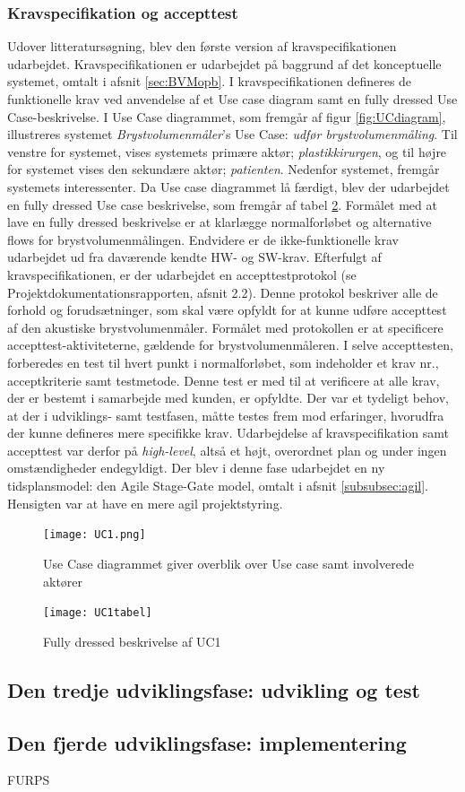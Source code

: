 	\subsubsection{Kravspecifikation og accepttest} 
	Udover litteratursøgning, blev den første version af kravspecifikationen udarbejdet. Kravspecifikationen er udarbejdet på baggrund af det konceptuelle systemet, omtalt i afsnit \ref{sec:BVMopb}. I kravspecifikationen defineres de funktionelle krav ved anvendelse af et Use case diagram samt en fully dressed Use Case-beskrivelse. I Use Case diagrammet, som fremgår af figur \ref{fig:UCdiagram}, illustreres systemet \textit{Brystvolumenmåler}'s Use Case: \textit{udfør brystvolumenmåling}. Til venstre for systemet, vises systemets primære aktør; \textit{plastikkirurgen}, og til højre for systemet vises den sekundære aktør; \textit{patienten}. Nedenfor systemet, fremgår systemets interessenter. Da Use case diagrammet lå færdigt, blev der udarbejdet en fully dressed Use case beskrivelse, som fremgår af tabel \ref{UCtabel}.
	 Formålet med at lave en fully dressed beskrivelse er at klarlægge normalforløbet og alternative flows for brystvolumenmålingen. Endvidere er de ikke-funktionelle krav udarbejdet ud fra daværende kendte HW- og SW-krav.
	Efterfulgt af kravspecifikationen, er der udarbejdet en  accepttestprotokol (se Projektdokumentationsrapporten, afsnit 2.2). Denne protokol beskriver alle de forhold og forudsætninger, som skal være opfyldt for at kunne udføre accepttest af den akustiske brystvolumenmåler. Formålet med protokollen er at specificere accepttest-aktiviteterne, gældende for brystvolumenmåleren. 
	I selve accepttesten, forberedes en test til hvert punkt i normalforløbet, som indeholder et krav nr., acceptkriterie samt testmetode. Denne test er med til at verificere at alle krav, der er bestemt i samarbejde med kunden, er opfyldte. 	
	Der var et tydeligt behov, at der i udviklings- samt testfasen, måtte testes frem mod erfaringer, hvorudfra der kunne defineres mere specifikke krav. Udarbejdelse af kravspecifikation samt accepttest var derfor på \textit{high-level}, altså et højt, overordnet plan og under ingen omstændigheder endegyldigt. Der blev i denne fase udarbejdet en ny tidsplansmodel: den Agile Stage-Gate model, omtalt i afsnit \ref{subsubsec:agil}. Hensigten var at have en mere agil projektstyring.  	
	\begin{figure}[htb]
	\centering	
	\texttt{[image: UC1.png]}
	\caption{Use Case diagrammet
 giver overblik over Use case samt involverede aktører}
	\label{UCdiagram}
	\end{figure}
	
	\begin{figure}[htb]
	\centering	
	\texttt{[image: UC1tabel]}
	\caption{Fully dressed beskrivelse af UC1}
	\label{UCtabel}
	\end{figure}
	
	
\subsection{Den tredje udviklingsfase: udvikling og test}
\subsection{Den fjerde udviklingsfase: implementering}

FURPS
 